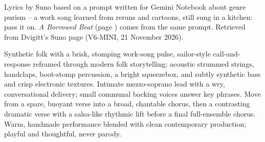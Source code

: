 
\label{sec:make-a-harbor-in-your-room}
\begin{notes}
Lyrics by Suno based on a prompt written for Gemini Notebook about genre purism -- a work song learned from reruns and cartoons, still sung in a kitchen: pass it on. \emph{A Borrowed Beat} (page \pageref{sec:a-borrowed-beat}) comes from the same prompt. Retrieved from Dvigitt's Suno page (V6-MINI, 21 November 2026).
\end{notes}
\begin{style}
Synthetic folk with a brisk, stomping work-song pulse, sailor-style call-and-response reframed through modern folk storytelling; acoustic strummed strings, handclaps, boot-stomp percussion, a bright squeezebox, and subtly synthetic bass and crisp electronic textures. Intimate mezzo-soprano lead with a wry, conversational delivery; small communal backing voices answer key phrases. Move from a spare, buoyant verse into a broad, chantable chorus, then a contrasting dramatic verse with a salsa-like rhythmic lift before a final full-ensemble chorus. Warm, handmade performance blended with clean contemporary production; playful and thoughtful, never parody.
\end{style}
